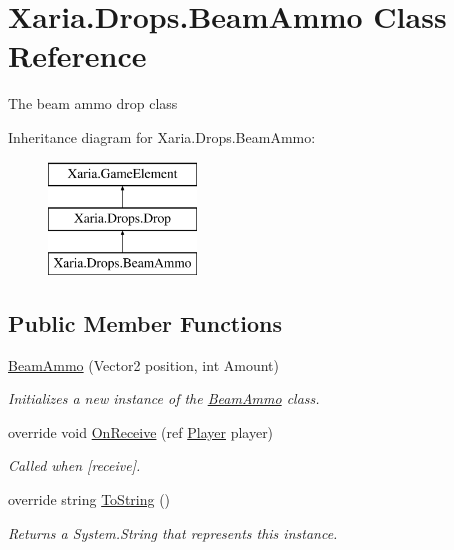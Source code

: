 \hypertarget{classXaria_1_1Drops_1_1BeamAmmo}{}\section{Xaria.\+Drops.\+Beam\+Ammo Class Reference}
\label{classXaria_1_1Drops_1_1BeamAmmo}


The beam ammo drop class  


Inheritance diagram for Xaria.\+Drops.\+Beam\+Ammo\+:\begin{figure}[H]
\begin{center}
\leavevmode
\includegraphics[height=3.000000cm]{classXaria_1_1Drops_1_1BeamAmmo}
\end{center}
\end{figure}
\subsection*{Public Member Functions}
\begin{DoxyCompactItemize}
\item 
\hyperlink{classXaria_1_1Drops_1_1BeamAmmo_abe0f6a09f4daab880e128767368db6f0}{Beam\+Ammo} (Vector2 position, int Amount)
\begin{DoxyCompactList}\small\item\em Initializes a new instance of the \hyperlink{classXaria_1_1Drops_1_1BeamAmmo}{Beam\+Ammo} class. \end{DoxyCompactList}\item 
override void \hyperlink{classXaria_1_1Drops_1_1BeamAmmo_aa7141e1cf73e97b303871d0db8576811}{On\+Receive} (ref \hyperlink{classXaria_1_1Player}{Player} player)
\begin{DoxyCompactList}\small\item\em Called when \mbox{[}receive\mbox{]}. \end{DoxyCompactList}\item 
override string \hyperlink{classXaria_1_1Drops_1_1BeamAmmo_ad368797dd8e08afff7189322eb29fefd}{To\+String} ()
\begin{DoxyCompactList}\small\item\em Returns a System.\+String that represents this instance. \end{DoxyCompactList}\end{DoxyCompactItemize}
